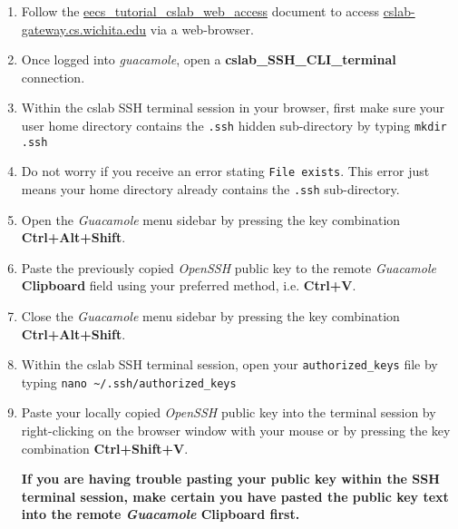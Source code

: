 \documentclass[12pt]{article}
\begin{document}
\begin{flushleft}
\begin{enumerate}
  \item Follow the \href{https://github.com/benroose/tutorials/blob/master/cslab_tutorials/eecs_tutorial_cslab_web_access.pdf}{eecs\_tutorial\_cslab\_web\_access} document to access \href{https://cslab-gateway.cs.wichita.edu/}{cslab-gateway.cs.wichita.edu} via a web-browser.
  \item Once logged into \textit{guacamole}, open a \textbf{cslab\_SSH\_CLI\_terminal} connection.
  \item Within the cslab SSH terminal session in your browser, first make sure your user home directory contains the \verb|.ssh| hidden sub-directory by typing
    \verb|mkdir .ssh|
  \item Do not worry if you receive an error stating \verb|File exists|. This error just means your home directory already contains the \verb|.ssh| sub-directory.
  \item Open the \textit{Guacamole} menu sidebar by pressing the key combination \textbf{Ctrl+Alt+Shift}.
  \item Paste the previously copied \textit{OpenSSH} public key to the remote \textit{Guacamole} \textbf{Clipboard} field using your preferred method, i.e. \textbf{Ctrl+V}.
  \item Close the \textit{Guacamole} menu sidebar by pressing the key combination \textbf{Ctrl+Alt+Shift}.
  \item Within the cslab SSH terminal session, open your \texttt{authorized\_keys} file by typing \break
  \verb|nano ~/.ssh/authorized_keys|
\item Paste your locally copied \textit{OpenSSH} public key into the terminal session by right-clicking on the browser window with your mouse or by pressing the key combination \textbf{Ctrl+Shift+V}.

  {\bf If you are having trouble pasting your public key within the SSH terminal session, make certain you have pasted the public key text into the remote \textit{Guacamole} \textbf{Clipboard} first.}


\end{enumerate}
\end{flushleft}
\end{document}
